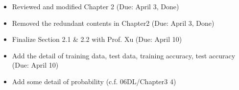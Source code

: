 \begin{itemize}
\item Reviewed and modified Chapter 2 (Due: April 3, Done) 
\item Removed the redundant contents in Chapter2 (Due: April 3, Done)
\item Finalize Section 2.1 \& 2.2 with Prof. Xu (Due: April 10)
\item Add the detail of training data, test data, training accuracy, test accuracy (Due: April 10)
\item Add some detail of probability (c.f. 06DL/Chapter3 4)
\end{itemize}